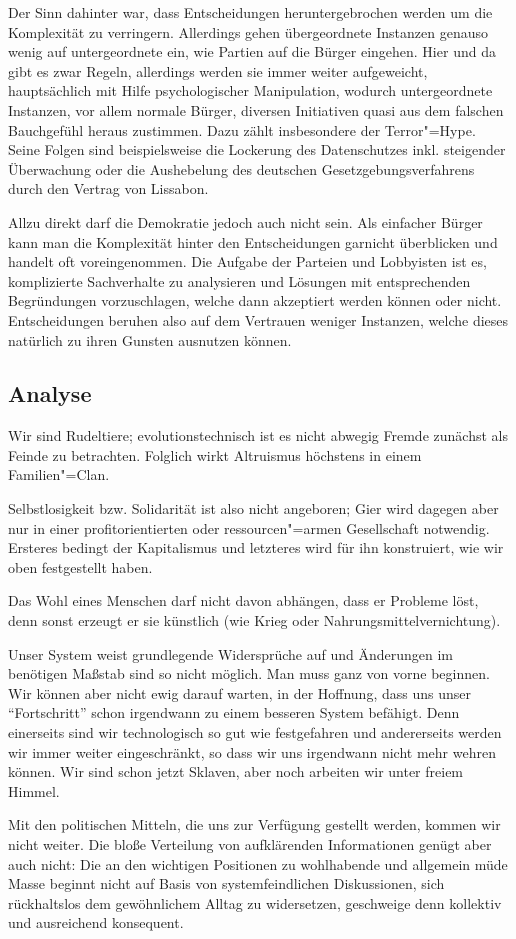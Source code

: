 Der Sinn dahinter war, dass Entscheidungen heruntergebrochen werden um die Komplexität zu verringern. Allerdings gehen übergeordnete Instanzen genauso wenig auf untergeordnete ein, wie Partien auf die Bürger eingehen. Hier und da gibt es zwar Regeln, allerdings werden sie immer weiter aufgeweicht, hauptsächlich mit Hilfe psychologischer Manipulation, wodurch untergeordnete Instanzen, vor allem normale Bürger, diversen Initiativen quasi aus dem falschen Bauchgefühl heraus zustimmen. Dazu zählt insbesondere der Terror"=Hype. Seine Folgen sind beispielsweise die Lockerung des Datenschutzes inkl. steigender Überwachung oder die Aushebelung des deutschen Gesetzgebungsverfahrens durch den Vertrag von Lissabon.

Allzu direkt darf die Demokratie jedoch auch nicht sein. Als einfacher Bürger kann man die Komplexität hinter den Entscheidungen garnicht überblicken und handelt oft voreingenommen. Die Aufgabe der Parteien und Lobbyisten ist es, komplizierte Sachverhalte zu analysieren und Lösungen mit entsprechenden Begründungen vorzuschlagen, welche dann akzeptiert werden können oder nicht. Entscheidungen beruhen also auf dem Vertrauen weniger Instanzen, welche dieses natürlich zu ihren Gunsten ausnutzen können.

\subsection{Analyse}\label{sec:situation/analysis}

Wir sind Rudeltiere; evolutionstechnisch ist es nicht abwegig Fremde zunächst als Feinde zu betrachten. Folglich wirkt Altruismus höchstens in einem Familien"=Clan.

Selbstlosigkeit bzw. Solidarität ist also nicht angeboren; Gier wird dagegen aber nur in einer profitorientierten oder ressourcen"=armen Gesellschaft notwendig. Ersteres bedingt der Kapitalismus und letzteres wird für ihn konstruiert, wie wir oben festgestellt haben.

Das Wohl eines Menschen darf nicht davon abhängen, dass er Probleme löst, denn sonst erzeugt er sie künstlich (wie Krieg oder Nahrungsmittelvernichtung).

Unser System weist grundlegende Widersprüche auf und Änderungen im benötigen Maßstab sind so nicht möglich. Man muss ganz von vorne beginnen. Wir können aber nicht ewig darauf warten, in der Hoffnung, dass uns unser "`Fortschritt"' schon irgendwann zu einem besseren System befähigt. Denn einerseits sind wir technologisch so gut wie festgefahren und andererseits werden wir immer weiter eingeschränkt, so dass wir uns irgendwann nicht mehr wehren können. Wir sind schon jetzt Sklaven, aber noch arbeiten wir unter freiem Himmel.

Mit den politischen Mitteln, die uns zur Verfügung gestellt werden, kommen wir nicht weiter. Die bloße Verteilung von aufklärenden Informationen genügt aber auch nicht: Die an den wichtigen Positionen zu wohlhabende und allgemein müde Masse beginnt nicht auf Basis von systemfeindlichen Diskussionen, sich rückhaltslos dem gewöhnlichem Alltag zu widersetzen, geschweige denn kollektiv und ausreichend konsequent. 
